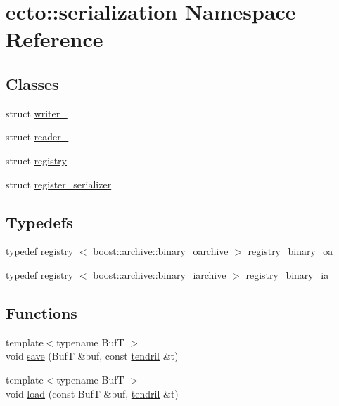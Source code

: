 \hypertarget{namespaceecto_1_1serialization}{\section{ecto\-:\-:serialization \-Namespace \-Reference}
\label{namespaceecto_1_1serialization}
}
\subsection*{\-Classes}
\begin{DoxyCompactItemize}
\item 
struct \hyperlink{structecto_1_1serialization_1_1writer__}{writer\-\_\-}
\item 
struct \hyperlink{structecto_1_1serialization_1_1reader__}{reader\-\_\-}
\item 
struct \hyperlink{structecto_1_1serialization_1_1registry}{registry}
\item 
struct \hyperlink{structecto_1_1serialization_1_1register__serializer}{register\-\_\-serializer}
\end{DoxyCompactItemize}
\subsection*{\-Typedefs}
\begin{DoxyCompactItemize}
\item 
typedef \hyperlink{structecto_1_1serialization_1_1registry}{registry}\*
$<$ boost\-::archive\-::binary\-\_\-oarchive $>$ \hyperlink{namespaceecto_1_1serialization_ad544c8b5416e0ecfe692922b2f2e8e54}{registry\-\_\-binary\-\_\-oa}
\item 
typedef \hyperlink{structecto_1_1serialization_1_1registry}{registry}\*
$<$ boost\-::archive\-::binary\-\_\-iarchive $>$ \hyperlink{namespaceecto_1_1serialization_a465425ff3a756de86571c1262f22d2ba}{registry\-\_\-binary\-\_\-ia}
\end{DoxyCompactItemize}
\subsection*{\-Functions}
\begin{DoxyCompactItemize}
\item 
{\footnotesize template$<$typename Buf\-T $>$ }\\void \hyperlink{namespaceecto_1_1serialization_a77b3e77a54adf1a888736007260a9343}{save} (\-Buf\-T \&buf, const \hyperlink{classecto_1_1tendril}{tendril} \&t)
\item 
{\footnotesize template$<$typename Buf\-T $>$ }\\void \hyperlink{namespaceecto_1_1serialization_a1960d58009e397c926055229f8e1c347}{load} (const \-Buf\-T \&buf, \hyperlink{classecto_1_1tendril}{tendril} \&t)
\end{DoxyCompactItemize}


